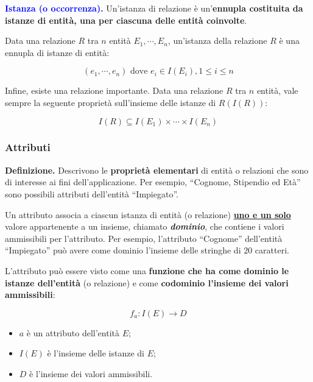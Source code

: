 \documentclass[a4paper]{article}
\newcommand{\dquotes}[1]{``#1''}
\begin{document}
	\noindent
	\textcolor{blue}{\textbf{Istanza (o occorrenza).}} Un'istanza di relazione è un'\textbf{ennupla costituita da istanze di entità, una per ciascuna delle entità coinvolte}.
	
	\noindent
	Data una relazione $R$ tra $n$ entità $E_1, \cdots, E_n$, un’istanza della relazione $R$ è una ennupla di istanze di entità:
	
	\begin{equation*}
		\left(e_1, \cdots, e_n\right) \text{ dove } e_i \in I(E_i), 1\le i \le n
	\end{equation*}

	\noindent
	Infine, esiste una relazione importante. Data una relazione $R$ tra $n$ entità, vale sempre la seguente proprietà sull’insieme delle istanze di $R (I(R))$:
	
	\begin{equation*}
		I(R) \subseteq I(E_1) \times \cdots \times I(E_n)
	\end{equation*}
	
	\newpage
	
	
	
	
	\subsubsection{Attributi}\label{attributi}
	
	\textcolor{Red3}{\textbf{Definizione.}} Descrivono le \textbf{proprietà elementari} di entità o relazioni che sono di interesse ai fini dell'applicazione. Per esempio, \dquotes{Cognome, Stipendio ed Età} sono possibili attributi dell'entità \dquotes{Impiegato}.
	
	Un attributo associa a ciascun istanza di entità (o relazione) \textbf{\underline{uno e un solo}} valore appartenente a un insieme, chiamato \textbf{\emph{dominio}}, che contiene i valori ammissibili per l'attributo. Per esempio, l'attributo \dquotes{Cognome} dell'entità \dquotes{Impiegato} può avere come dominio l'insieme delle stringhe di $20$ caratteri.
	
	L'attributo può essere visto come una \textbf{funzione che ha come dominio le istanze dell'entità} (o relazione) e come \textbf{codominio l'insieme dei valori ammissibili}:
	
	\begin{equation*}
		f_{a} : I\left(E\right) \rightarrow D
	\end{equation*}

	\begin{itemize}
		\item $a$ è un attributo dell'entità $E$;
		
		\item $I\left(E\right)$ è l'insieme delle istanze di $E$;
		
		\item $D$ è l'insieme dei valori ammissibili.
	\end{itemize}
	
\end{document}
